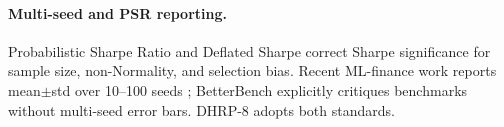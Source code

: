 \paragraph{Multi-seed and PSR reporting.}
Probabilistic Sharpe Ratio \citep{Bailey2012PSR} and Deflated Sharpe
\citep{Bailey2014DSR} correct Sharpe significance for sample size,
non-Normality, and selection bias. Recent ML-finance work reports
mean$\pm$std over 10--100 seeds \citep{ParraDiaz2025,Pan2024BPQP};
BetterBench \citep{Reuel2024BetterBench} explicitly critiques benchmarks
without multi-seed error bars. DHRP-8 adopts both standards.
